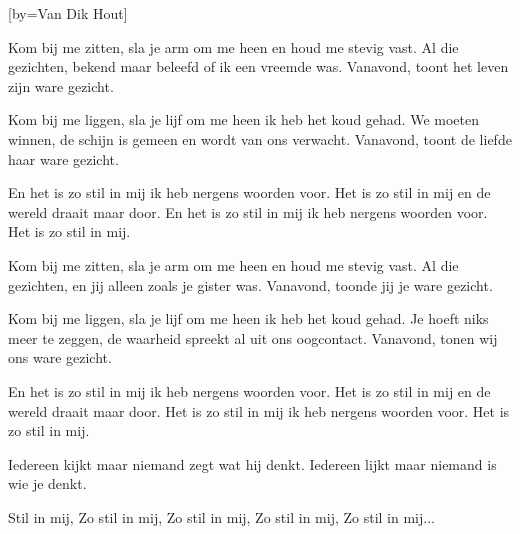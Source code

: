  

[by=Van Dik Hout]




\beginverse
Kom bij me zitten, sla je arm om me heen en houd me stevig vast.
Al die gezichten, bekend maar beleefd of ik een vreemde was.
Vanavond, toont het leven zijn ware gezicht.
\endverse

\beginverse
Kom bij me liggen, sla je lijf om me heen ik heb het koud gehad.
We moeten winnen, de schijn is gemeen en wordt van ons verwacht.
Vanavond, toont de liefde haar ware gezicht.
\endverse

\beginchorus
En het is zo stil in mij ik heb nergens woorden voor.
Het is zo stil in mij en de wereld draait maar door.
En het is zo stil in mij ik heb nergens woorden voor.
Het is zo stil in mij.
\endchorus

\beginverse
Kom bij me zitten, sla je arm om me heen en houd me stevig vast.
Al die gezichten, en jij alleen zoals je gister was.
Vanavond, toonde jij je ware gezicht.
\endverse

\beginverse
Kom bij me liggen, sla je lijf om me heen ik heb het koud gehad.
Je hoeft niks meer te zeggen, de waarheid spreekt al uit ons oogcontact.
Vanavond, tonen wij ons ware gezicht.
\endverse

\beginchorus
En het is zo stil in mij ik heb nergens woorden voor.
Het is zo stil in mij en de wereld draait maar door.
Het is zo stil in mij ik heb nergens woorden voor.
Het is zo stil in mij.
\endchorus

\beginverse
Iedereen kijkt maar niemand zegt wat hij denkt.
Iedereen lijkt maar niemand is wie je denkt.
\endverse

\beginverse
Stil in mij, \brk  Zo stil in mij, \brk  Zo stil in mij, \brk  Zo stil in mij, \brk  Zo stil in mij...
\endverse

\endsong
